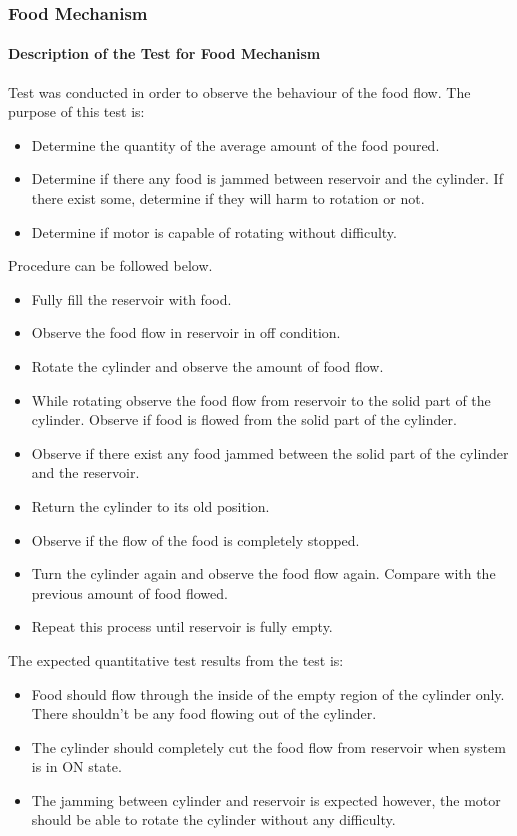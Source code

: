 \subsubsection{Food Mechanism}
\paragraph{Description of the Test for Food Mechanism}
Test was conducted in order to observe the behaviour of the food flow.
The purpose of this test is:
\begin{itemize}
    \item Determine the quantity of the average amount of the food poured. 
    \item Determine if there any food is jammed between reservoir and the cylinder. If there exist some, determine if they will harm to rotation or not.
    \item Determine if motor is capable of rotating without difficulty.
\end{itemize}

Procedure can be followed below.
\begin{itemize}
    \item Fully fill the reservoir with food.
    \item Observe the food flow in reservoir in off condition.
    \item Rotate the cylinder and observe the amount of food flow.
    \item While rotating observe the food flow from reservoir to the solid part of the cylinder. Observe if food is flowed from the solid part of the cylinder.
    \item Observe if there exist any food jammed between the solid part of the cylinder and the reservoir. 
    \item Return the cylinder to its old position.
    \item Observe if the flow of the food is completely stopped. 
    \item Turn the cylinder again and observe the food flow again. Compare with the previous amount of food flowed.
    \item Repeat this process until reservoir is fully empty.
\end{itemize}

The expected quantitative test results from the test is:
\begin{itemize}
    \item Food should flow through the inside of the empty region of the cylinder only. There shouldn't be any food flowing out of the cylinder. 
    \item The cylinder should completely cut the food flow from reservoir when system is in ON state.
    \item The jamming between cylinder and reservoir is expected however, the motor should be able to rotate the cylinder without any difficulty.
\end{itemize}

